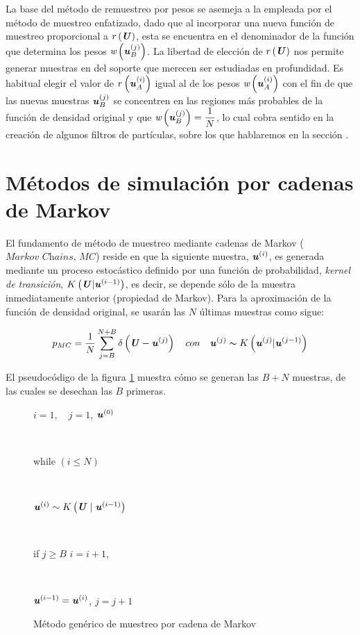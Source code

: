 La base del método de remuestreo por pesos se asemeja a la empleada por el método de muestreo enfatizado, dado que al incorporar una nueva función de muestreo proporcional a $r\left(\textbf{\textit{U}}\right)$, esta se encuentra en el denominador de la función que determina los pesos $\textit{w}\left(\textbf{\textit{u}}_{B}^{(j)}\right)$. La libertad de elección de $r\left(\textbf{\textit{U}}\right)$ nos permite generar muestras en del soporte que merecen ser estudiadas en profundidad. Es habitual elegir el valor de $r\left(\textbf{\textit{u}}_{A}^{(i)}\right)$ igual al de los pesos $\textit{w}\left(\textbf{\textit{u}}_{A}^{(i)}\right)$ con el fin de que las nuevas muestras $\textbf{\textit{u}}_{B}^{(j)}$ se concentren en las regiones más probables de la función de densidad original y que $\textit{w}\left(\textbf{\textit{u}}_{B}^{(j)}\right) = \dfrac{1}{N}$, lo cual cobra sentido en la creación de algunos filtros de partículas, sobre los que hablaremos en la sección .


\section{Métodos de simulación por cadenas de Markov}
El fundamento de método de muestreo mediante cadenas de Markov ($\textit{Markov Chains, MC}$) reside en que la siguiente muestra, $\textbf{\textit{u}}^{(i)}$, es generada mediante un proceso estocástico definido por una función de probabilidad, \textit{kernel de transición}, $K\left(\textbf{\textit{U}}|\textbf{\textit{u}}^{(i-1)}\right)$, es decir, se depende sólo de la muestra inmediatamente anterior (propiedad de Markov).
Para la aproximación de la función de densidad original, se usarán las $N$ últimas muestras como sigue:

\begin{equation}
    p_{MC} = \frac{1}{N}\sum_{j = B}^{N+B}\delta\left(\textbf{\textit{U}}-\textbf{\textit{u}}^{(j)}\right) \quad con \quad \textbf{\textit{u}}^{(j)} \thicksim K\left(\textbf{\textit{u}}^{(j)}|\textbf{\textit{u}}^{(j-1)}\right)
    \label{ec:3.6}
\end{equation}

El pseudocódigo de la figura \ref{fig:3.4} muestra cómo se generan las $B+N$ muestras, de las cuales se desechan las $B$ primeras.
\begin{figure}[ht]
    \centering
    \begin{tcolorbox}[colframe=black, colback=white, boxrule=0.5pt, width=0.45\textwidth, sharp corners]
        \parbox[t]{\linewidth}{$i=1, \quad j=1$, \quad {} $\textbf{\textit{u}}^{(0)}$} \\[0.5em]
        \parbox[t]{\linewidth}{while $(i \leq N)$} \\[0.5em]
        \parbox[t]{\linewidth}{\hspace{1em} $\textbf{\textit{u}}^{(i)} \sim K \left( \textbf{\textit{U}} \mid \textbf{\textit{u}}^{(i-1)} \right)$} \\[0.5em]
        \parbox[t]{\linewidth}{\hspace{1em} if $j \geq B$  $i = i + 1$,} \\[0.5em]
        \parbox[t]{\linewidth}{\hspace{1em}  $\textbf{\textit{u}}^{(i-1)} = \textbf{\textit{u}}^{(i)}$, \quad $j = j + 1$}
    \end{tcolorbox}
    \caption{Método genérico de muestreo por cadena de Markov}
    \label{fig:3.4}
\end{figure}


